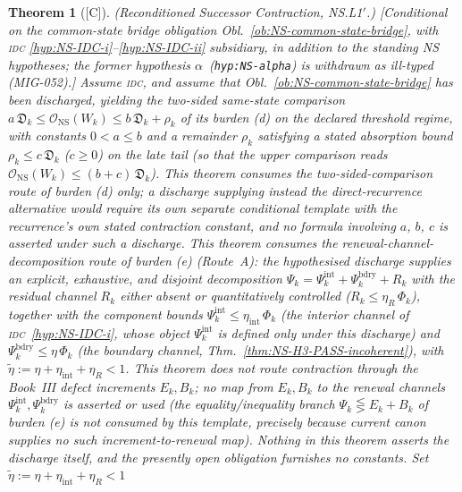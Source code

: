 \documentclass[12pt,oneside]{amsbook}
\theoremstyle{plain}
\newtheorem{theorem}{Theorem}[section]
\theoremstyle{definition}
\theoremstyle{remark}
\newcommand{\status}[1]{\textup{[#1]}}
\begin{document}
\begin{theorem}[\status{C}]\label{thm:NSL1}
\textup{(Reconditioned Successor Contraction, NS.L1$'$.)}
\textup{[Conditional on the common-state bridge obligation
Obl.~\ref{ob:NS-common-state-bridge}, with \textsc{idc}
\eqref{hyp:NS-IDC-i}--\eqref{hyp:NS-IDC-ii} subsidiary, in addition
to the standing NS hypotheses; the former hypothesis
$\alpha$~(\texttt{hyp:NS-alpha}) is withdrawn as ill-typed
(MIG-052).]}
Assume \textsc{idc}, and assume that
Obl.~\ref{ob:NS-common-state-bridge} \emph{has been discharged},
yielding the two-sided same-state comparison
$a\,\mathfrak{D}_k \leq \mathcal{O}_{\mathrm{NS}}(W_k) \leq
b\,\mathfrak{D}_k + \rho_k$ of its burden (d) on the declared
threshold regime, with constants $0 < a \leq b$ and a remainder
$\rho_k$ satisfying a stated absorption bound
$\rho_k \leq c\,\mathfrak{D}_k$ ($c \geq 0$) on the late tail
(so that the upper comparison reads
$\mathcal{O}_{\mathrm{NS}}(W_k) \leq (b+c)\,\mathfrak{D}_k$).
\emph{This theorem consumes the two-sided-comparison route of
burden (d) only}; a discharge supplying instead the
direct-recurrence alternative would require its own separate
conditional template with the recurrence's own stated contraction
constant, and no formula involving $a$, $b$, $c$ is asserted under
such a discharge. \emph{This theorem consumes the renewal-channel-decomposition
route of burden (e)} (Route~A): the hypothesised discharge supplies
an explicit, exhaustive, and disjoint decomposition
$\Psi_k = \Psi_k^{\mathrm{int}} + \Psi_k^{\mathrm{bdry}} + R_k$
with the residual channel $R_k$ either absent or quantitatively
controlled ($R_k \leq \eta_R\,\Phi_k$), together with the
component bounds
$\Psi_k^{\mathrm{int}} \leq \eta_{\mathrm{int}}\,\Phi_k$
(the interior channel of \textsc{idc}~\eqref{hyp:NS-IDC-i}, whose
object $\Psi_k^{\mathrm{int}}$ is defined only under this
discharge) and
$\Psi_k^{\mathrm{bdry}} \leq \eta\,\Phi_k$ (the boundary
channel, Thm.~\ref{thm:NS-H3-PASS-incoherent}), with
$\widetilde\eta := \eta + \eta_{\mathrm{int}} + \eta_R < 1$.
\emph{This theorem does not route contraction through the Book~III
defect increments $E_k, B_k$; no map from $E_k, B_k$ to the renewal
channels $\Psi_k^{\mathrm{int}}, \Psi_k^{\mathrm{bdry}}$ is
asserted or used} (the equality/inequality branch
$\Psi_k \lesseqgtr E_k + B_k$ of burden (e) is \emph{not}
consumed by this template, precisely because current canon supplies
no such increment-to-renewal map). Nothing in this theorem asserts
the discharge itself, and the
presently open obligation furnishes no constants. Set
$\widetilde\eta := \eta + \eta_{\mathrm{int}} + \eta_R < 1$

\end{theorem}
\end{document}
